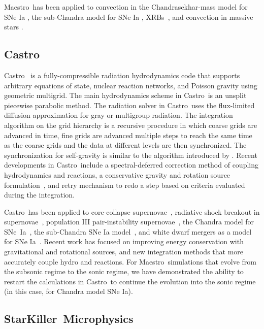\documentclass[a4paper]{jpconf}
\newcommand{\maestro}{{\sffamily Maestro}}
\newcommand{\castro}{{\sffamily Castro}}
\newcommand{\starkiller}{{\sffamily StarKiller}}
\newcommand{\MarginPar}[1]{\marginpar{\vskip-\baselineskip\raggedright\tiny\sffamily\hrule\smallskip{\color{red}#1}\par\smallskip\hrule}}
\begin{document}
\maestro\ has been applied to convection in the Chandrasekhar-mass
model for SNe Ia \cite{ZABNW:IV,wdconvect,wdturb}, the sub-Chandra
model for SNe Ia \cite{subchandra,subchandra2},
XRBs~\cite{xrb,xrb2,xrb3}, and convection in massive stars
\cite{ms_cc}.



\subsection{\castro}

\castro~\cite{castro,castroII,castroIII} is a fully-compressible
radiation hydrodynamics code that supports arbitrary equations of
state, nuclear reaction networks, and Poisson gravity using geometric
multigrid.  The main hydrodynamics scheme in \castro\ is an unsplit
piecewise parabolic method.  The radiation solver in \castro\ uses the
flux-limited diffusion approximation for gray or multigroup radiation.
The integration algorithm on the grid hierarchy is a recursive
procedure in which coarse grids are advanced in time, fine grids are
advanced multiple steps to reach the same time as the coarse grids and
the data at different levels are then synchronized. The
synchronization for self-gravity is similar to the algorithm
introduced by \cite{miniati-colella}.  Recent developments in
\castro\ include a spectral-deferred correction method of coupling
hydrodynamics and reactions, a conservative gravity and rotation
source formulation~\cite{wdmergerI}, and retry mechanism to redo a
step based on criteria evaluated during the
integration.\MarginPar{more new stuff?}

\castro\ has been applied to core-collapse
supernovae~\cite{castro-ccsne}, radiative shock breakout in
supernovae~\cite{lovegrove:2017}, population III pair-instability
supernovae~\cite{castro-pairinstability}, the Chandra model for
SNe~Ia~\cite{ma:2013}, the sub-Chandra SNe Ia model~\cite{moll:2013}, and white dwarf mergers as a model for SNe
Ia~\cite{moll:2014,wdmergerI}. Recent work has focused on improving energy
conservation with gravitational and rotational sources, and new
integration methods that more accurately couple hydro and reactions.
For \maestro\ simulations that evolve from the subsonic regime to the
sonic regime, we have demonstrated the ability to restart the
calculations in \castro\ to continue the evolution into the sonic
regime~\cite{scidac-petascale,malone:2014} (in this case, for Chandra
model SNe Ia).

\subsection{\starkiller\ Microphysics}
\end{document}
